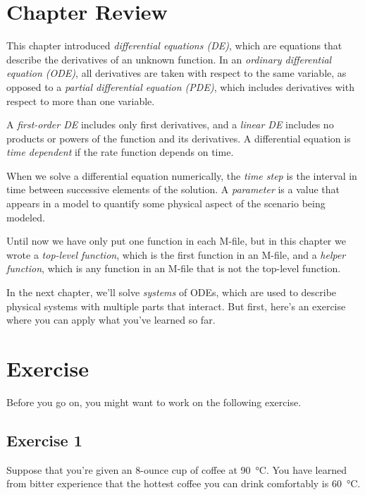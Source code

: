 \section{Chapter Review}

This chapter introduced \emph{differential equations (DE)}, which are equations that describe the
derivatives of an unknown function.
In an \emph{ordinary differential equation (ODE)}, all derivatives are taken with
respect to the same variable, as opposed to a \emph{partial differential equation (PDE)}, which includes derivatives with respect to more than one variable.

A \emph{first-order DE} includes only first derivatives, and a \emph{linear DE} includes no products or powers of the function and its derivatives.
A differential equation is \emph{time dependent} if the rate function depends on time.

When we solve a differential equation numerically, the \emph{time step} is the interval in time between successive elements of the solution.
A \emph{parameter} is a value that appears in a model to quantify some
physical aspect of the scenario being modeled.

Until now we have only put one function in each M-file, but in this chapter we wrote a \emph{top-level function}, which is the first function in an M-file, and a \emph{helper function}, which is any function in an M-file that is not the top-level function.

In the next chapter, we'll solve \emph{systems} of ODEs, which are used to describe physical systems with multiple parts that interact.
But first, here's an exercise where you can apply what you've learned so far.


\section{Exercise}

Before you go on, you might want to work on the following exercise.

\subsection{Exercise 1}


Suppose that you're given an 8-ounce cup of coffee at \SI{90}{\celsius}.
You have learned from bitter experience that the hottest coffee you
can drink comfortably is \SI{60}{\celsius}.  

